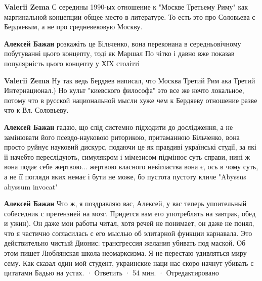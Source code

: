 \begin{itemize}
\begin{itemize}
\textbf{Valerii Zema} С середины 1990-ых отношение к "Москве Третьему Риму" как маргинальной концепции общее место в литературе. То есть это про Соловьева с Бердяевым, а не про средневековую Москву.

 
\textbf{Алексей Бажан} розкажіть це Більченко, вона переконана в середньовічному побутуванні цього концепту, тоді як Маршал По чітко і давно вже показав популярність цього концепту у ХІХ столітті

 
\textbf{Valerii Zema} Ну так ведь Бердяев написал, что Москва Третий Рим ака Третий Интернационал.) Но культ "киевского философа" это все же нечто локальное, потому что в русской национальной мысли хуже чем к Бердяеву отношение разве что к Вл. Соловьеву.

 
\textbf{Алексей Бажан} гадаю, що слід системно підходити до дослідження, а не замінювати його псевдо-науковою риторикою, притаманною Більченко, вона просто руйнує науковий дискурс, подаючи це як правдиві українські студії, за які її начебто переслідують, симулякром і мімезисом підмінює суть справи, нині ж вона подає себе жертвою... жертвою власного невігластва вона є, ось в чому суть, а не її погляди яких немає і бути не може, бо пустота пустоту кличе "Abyssus abyssum invocat"

 
\textbf{Алексей Бажан} Что ж, я поздравляю вас, Алексей, у вас теперь упоительный собеседник с претензией на мозг. Придется вам его употреблять на завтрак, обед и ужин). Он даже мои работы читал, хотя речей не понимает, он даже не понял, что я частично согласилась с его мыслью об элитарной функции карнавала. Это действительно чистый Дионис: трансгрессия желания убивать под маской. Об этом пишет Люблянская школа неомарксизма. Я не перестаю удивляться миру сему. Как сказал один мой студент, украинские наци нас скоро начнут убивать с цитатами Бадью на устах.
 · Ответить · 54 мин. · Отредактировано
 

\end{itemize}
\end{itemize}
